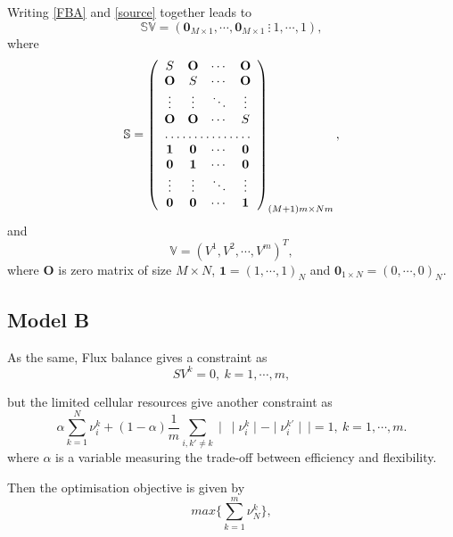\documentclass[paper=a4, fontsize=12pt]{scrartcl}	%
\numberwithin{equation}{section}					%
\numberwithin{figure}{section}					%
\numberwithin{table}{section}					%
\begin{document}
Writing \eqref{FBA} and \eqref{source} together leads to 
\begin{equation}
\mathbb S \mathbb V=(\mathbf 0_{M\times 1}, \cdots, \mathbf 0_{M\times 1}\ \vdots \ 1, \cdots, 1),
\end{equation}
where 
\begin{equation}
\nonumber \mathbb S =\left(\begin{array}{cccc}  S & \mathbf O & \cdots & \mathbf O \\
							\mathbf O & S & \cdots & \mathbf O \\
							\vdots & \vdots & \ddots & \vdots \\
							\mathbf O & \mathbf O & \cdots & S \\ 
							\hdotsfor{4}\\
							\mathbf 1 &  \mathbf 0 & \cdots & \mathbf 0 \\ 
							\mathbf 0 &  \mathbf 1 & \cdots & \mathbf 0 \\ 
							\vdots & \vdots & \ddots & \vdots \\ 
							\mathbf 0 & \mathbf 0 & \cdots & \mathbf 1\end{array}\right)_{(M+1)m\times Nm},
\end{equation}
and
\begin{equation}
\nonumber \mathbb V=(V^1, V^2, \cdots, V^m)^T,
\end{equation}
where $\mathbf O$ is zero matrix  of size $M\times N$,  $\mathbf 1 =(1, \cdots, 1)_{N}$ and $\mathbf 0_{1\times N} =(0, \cdots, 0)_{N}$. 

\subsection*{Model B} 
As the same, Flux balance gives a constraint as 
\begin{equation}
\label{FBA1}
SV^k=0,\ k=1,\cdots,m,
\end{equation}

but the limited cellular resources give another constraint as
\begin{equation}
\label{source1} \alpha \sum_{k=1}^N\nu_i^k +(1-\alpha)\frac{1}{m}\sum_{i, k'\neq k}\mid\ \mid\nu_i^k\mid-\mid\nu_i^{k'}\mid\ \mid=1,\ k=1,\cdots,m.
\end{equation}
where $\alpha$ is a variable measuring the trade-off between efficiency and flexibility.

Then the optimisation objective is given by
\begin{equation}\label{objective1}
max\{ \sum_{k=1}^m  \nu_{N}^k\}, 
\end{equation}
\end{document}
